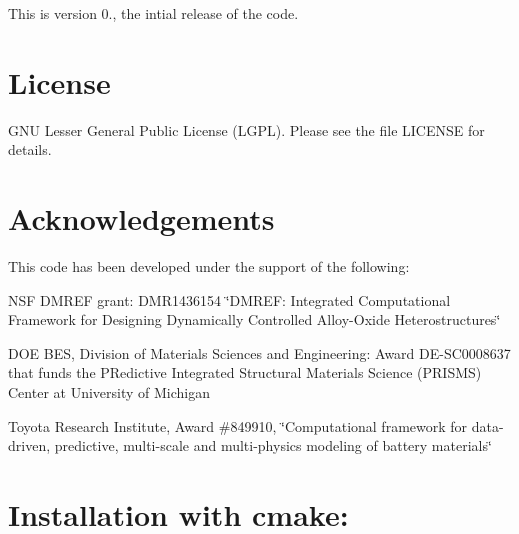 This is version 0., the intial release of the code.

\section*{{\bfseries{License}}~\newline
 }

G\+NU Lesser General Public License (L\+G\+PL). Please see the file L\+I\+C\+E\+N\+SE for details.

\section*{{\bfseries{Acknowledgements}}~\newline
 }

This code has been developed under the support of the following\+: ~\newline



\begin{DoxyItemize}
\item N\+SF D\+M\+R\+EF grant\+: D\+M\+R1436154 \char`\"{}\+D\+M\+R\+E\+F\+: Integrated Computational Framework for Designing Dynamically Controlled Alloy-\/\+Oxide Heterostructures\char`\"{} ~\newline

\item D\+OE B\+ES, Division of Materials Sciences and Engineering\+: Award DE-\/S\+C0008637 that funds the P\+Redictive Integrated Structural Materials Science (P\+R\+I\+S\+MS) Center at University of Michigan ~\newline

\item Toyota Research Institute, Award \#849910, \char`\"{}\+Computational framework for data-\/driven, predictive, multi-\/scale and multi-\/physics modeling of battery materials\char`\"{} ~\newline

\end{DoxyItemize}

\section*{{\bfseries{Installation with cmake\+:}}~\newline
 }


